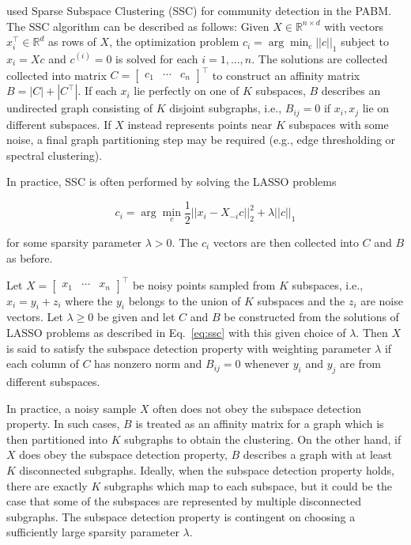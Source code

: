 \documentclass[12pt]{article}
\begin{document}
\citet*{noroozi2019estimation} used Sparse Subspace Clustering (SSC) 
\cite{5206547} for community detection in the PABM. 
The SSC algorithm can be described as follows: 
Given \(X \in \mathbb{R}^{n \times d}\) with vectors
\(x_i^\top \in \mathbb{R}^d\) as rows of \(X\), the optimization problem
\(c_i = \arg\min_{c} ||c||_1\) subject to \(x_i = X c\) and
\(c^{(i)} = 0\) is solved for each \(i = 1, ..., n\). The solutions are
collected collected into matrix
\(C = \begin{bmatrix} c_1 & \cdots & c_n \end{bmatrix}^\top\) to
construct an affinity matrix \(B = |C| + |C^\top|\). If each \(x_i\) lie
perfectly on one of \(K\) subspaces, \(B\) describes an undirected graph
consisting of \(K\) disjoint subgraphs, i.e., \(B_{ij} = 0\) if
\(x_i, x_j\) lie on different subspaces. If \(X\) instead represents
points near \(K\) subspaces with some noise, a final graph partitioning
step may be required (e.g., edge thresholding or spectral clustering).

In practice, SSC is often performed by solving the LASSO problems

\begin{equation} \label{eq:ssc}
c_i = \arg\min_c \frac{1}{2} ||x_i - X_{-i} c||^2_2 + \lambda ||c||_1
\end{equation}

for some sparsity parameter \(\lambda > 0\). The \(c_i\) vectors are
then collected into \(C\) and \(B\) as before.

\begin{definition}
  \label{def:subspace_detection}
Let $X = \begin{bmatrix} x_1 & \cdots & x_n \end{bmatrix}^\top$ be noisy
points sampled from $K$ subspaces, i.e., $x_i = y_i + z_i$ where the
$y_i$ belongs to the union of $K$ subspaces and the $z_i$ are noise
vectors. Let $\lambda \geq 0$ be given and
let $C$ and $B$
be constructed from the
solutions of LASSO problems as described in Eq.~\eqref{eq:ssc} with
this given choice of $\lambda$. Then $X$
is said to satisfy the subspace detection property with weighting parameter $\lambda$ if each column of
$C$ has nonzero norm and $B_{ij} = 0$ whenever $y_i$ and $y_j$ are
from different subspaces.
\end{definition}

\begin{remark}
In practice, a noisy sample $X$ often does not obey the subspace detection
property. In such cases, $B$ is treated as an affinity matrix for a graph which
is then partitioned into $K$ subgraphs to obtain the clustering. On the other
hand, if $X$ does obey the subspace detection property, $B$ describes a graph
with at least $K$ disconnected subgraphs. Ideally, when the subspace detection
property holds, there are exactly $K$ subgraphs which map to each subspace,
but it could be the case that some of the subspaces are represented by
multiple disconnected subgraphs. The subspace detection property is contingent
on choosing a sufficiently large sparsity parameter $\lambda$.
\end{remark}
\end{document}
